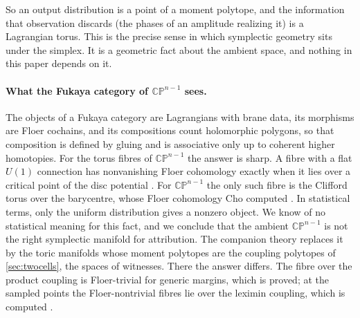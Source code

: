 \documentclass[11pt]{article}
\theoremstyle{definition}
\theoremstyle{remark}
\begin{document}
So an output distribution is a point of a moment polytope, and the information that observation
discards (the phases of an amplitude realizing it) is a Lagrangian torus. This is the precise
sense in which symplectic geometry sits under the simplex. It is a geometric fact about the ambient
space, and nothing in this paper depends on it.

\paragraph{What the Fukaya category of $\mathbb{CP}^{n-1}$ sees.} The objects of a Fukaya category are
Lagrangians with brane data, its morphisms are Floer cochains, and its compositions count holomorphic
polygons, so that composition is defined by gluing and is associative only up to coherent higher
homotopies. For the torus fibres of $\mathbb{CP}^{n-1}$ the answer is sharp. A fibre with a flat
$U(1)$ connection has nonvanishing Floer cohomology exactly when it lies over a critical point of
the disc potential \cite{ChoOh2006,FOOO2010}. For $\mathbb{CP}^{n-1}$ the only such fibre is the
Clifford torus over the barycentre, whose Floer cohomology Cho computed \cite{Cho2004}. In statistical terms, only
the uniform distribution gives a nonzero object. We know of no statistical meaning for this fact, and
we conclude that the ambient $\mathbb{CP}^{n-1}$ is not the right symplectic manifold for attribution. The companion theory
\cite{Awasthi-Conditionals} replaces it by the toric manifolds whose moment polytopes are the coupling polytopes of
\cref{sec:twocells}, the spaces of witnesses. There the answer differs. The fibre over the product coupling is
Floer-trivial for generic margins, which is proved; at the sampled points the Floer-nontrivial fibres lie over the
leximin coupling, which is computed \cite[Prop.~10.11, \S10.4]{Awasthi-Conditionals}.
\end{document}
